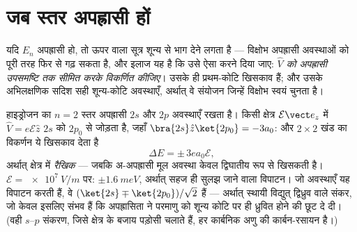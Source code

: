 \section{जब स्तर अपह्रासी हों}

\begin{theorem}[अपह्रासी विक्षोभ सिद्धांत]\label{thm:b3:perturbation-theory:degenerate}
यदि $E_n$ अपह्रासी हो, तो ऊपर वाला सूत्र शून्य से भाग देने लगता है ---
विक्षोभ अपह्रासी अवस्थाओं को पूरी तरह फिर से गढ़ सकता है, और
इलाज यह है कि उसे ऐसा करने दिया जाए: \emph{$\hat V$ को अपह्रासी उपसमष्टि
तक सीमित करके विकर्णित कीजिए}। उसके  ही प्रथम-कोटि
खिसकाव हैं; और उसके अभिलक्षणिक सदिश सही शून्य-कोटि अवस्थाएँ, अर्थात्
वे संयोजन जिन्हें विक्षोभ स्वयं चुनता है।
\end{theorem}
\admitted

\begin{example}[रैखिक स्टार्क प्रभाव]\label{ex:b3:perturbation-theory:stark}
हाइड्रोजन का $n = 2$ स्तर अपह्रासी $2s$ और $2p$ अवस्थाएँ रखता है।
किसी क्षेत्र $\mathcal E\vect e_z$ में $\hat V = e\mathcal E\hat z$
$2s$ को $2p_0$ से जोड़ता है, जहाँ $\bra{2s}\hat z\ket{2p_0} = -3a_0$:
और $2\times2$ खंड का विकर्णन ये खिसकाव देता है
\[
\Delta E = \pm\,3e a_0\mathcal E ,
\]
अर्थात् क्षेत्र में \emph{रैखिक} --- जबकि अ-अपह्रासी मूल अवस्था
केवल द्विघातीय रूप से खिसकती है। $\mathcal E = \qty{e7}{V/m}$ पर: $\pm
\qty{1.6}{meV}$, अर्थात् सहज ही सुलझ जाने वाला विपाटन। जो अवस्थाएँ यह
विपाटन करती हैं, वे $(\ket{2s} \mp \ket{2p_0})/\sqrt2$ हैं --- अर्थात्
स्थायी विद्युत् द्विध्रुव वाले संकर, जो केवल इसलिए संभव हैं कि
अपह्रासिता ने परमाणु को शून्य कोटि पर ही ध्रुवित होने की छूट दे दी। (वही
$s$--$p$ संकरण, जिसे क्षेत्र के बजाय पड़ोसी चलाते हैं, हर कार्बनिक अणु
की कार्बन-रसायन है।)
\end{example}

